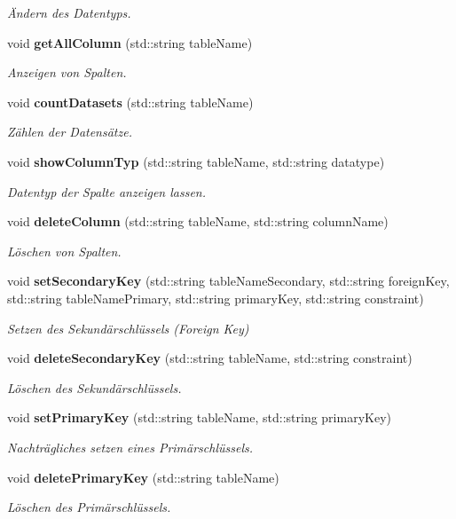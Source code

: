 \begin{DoxyCompactItemize}
\begin{DoxyCompactList}\small\item\em Ändern des Datentyps. \end{DoxyCompactList}\item 
void \textbf{ get\+All\+Column} (std\+::string table\+Name)
\begin{DoxyCompactList}\small\item\em Anzeigen von Spalten. \end{DoxyCompactList}\item 
void \textbf{ count\+Datasets} (std\+::string table\+Name)
\begin{DoxyCompactList}\small\item\em Zählen der Datensätze. \end{DoxyCompactList}\item 
void \textbf{ show\+Column\+Typ} (std\+::string table\+Name, std\+::string datatype)
\begin{DoxyCompactList}\small\item\em Datentyp der Spalte anzeigen lassen. \end{DoxyCompactList}\item 
void \textbf{ delete\+Column} (std\+::string table\+Name, std\+::string column\+Name)
\begin{DoxyCompactList}\small\item\em Löschen von Spalten. \end{DoxyCompactList}\item 
void \textbf{ set\+Secondary\+Key} (std\+::string table\+Name\+Secondary, std\+::string foreign\+Key, std\+::string table\+Name\+Primary, std\+::string primary\+Key, std\+::string constraint)
\begin{DoxyCompactList}\small\item\em Setzen des Sekundärschlüssels (Foreign Key) \end{DoxyCompactList}\item 
void \textbf{ delete\+Secondary\+Key} (std\+::string table\+Name, std\+::string constraint)
\begin{DoxyCompactList}\small\item\em Löschen des Sekundärschlüssels. \end{DoxyCompactList}\item 
void \textbf{ set\+Primary\+Key} (std\+::string table\+Name, std\+::string primary\+Key)
\begin{DoxyCompactList}\small\item\em Nachträgliches setzen eines Primärschlüssels. \end{DoxyCompactList}\item 
void \textbf{ delete\+Primary\+Key} (std\+::string table\+Name)
\begin{DoxyCompactList}\small\item\em Löschen des Primärschlüssels. \end{DoxyCompactList}\end{DoxyCompactItemize}


